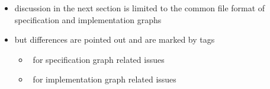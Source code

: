 \begin{frame}[t]
\begin{itemize}
\item discussion in the next section is limited to the common file format of specification and implementation graphs
\item but differences are pointed out and are marked by tags
\begin{itemize}
\item  \SGX\ for specification graph related issues 
\item  \IGX\ for implementation graph related issues 
\end{itemize}
\end{itemize}
\end{frame}
